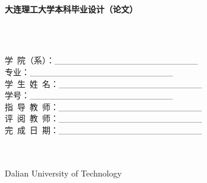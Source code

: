 \renewcommand{\figurename}{\zihao{5} \songti 图}	
\renewcommand{\tablename}{\zihao{5} \songti 表}
	\begin{titlepage}
		\begin{center}
			~\\[8pt]
			 {\songti\textbf{大连理工大学本科毕业设计（论文）}}
			~\\[35pt]
			\textbf{}
			~\\[15pt]
		\end{center}
		\textbf{}
		\begin{center}
			~\\[120pt]
			\begin{spacing}{1.7}
				 {\songti 学\ 院（系）：\_\_\_\_\_\_\_\_\_\_\_\_\_\_\_\_\_\_\_\_\_\_\_}\\
				 {\songti 专\qquad \quad  业：\_\_\_\_\_\_\_\_\_\_\_\_\_\_\_\_\_\_\_\_\_\_\_}\\
				 {\songti 学\ 生\ 姓\ 名：\_\_\_\_\_\_\_\_\_\_\_\_\_\_\_\_\_\_\_\_\_\_\_}\\
				 {\songti 学\qquad \quad 号：\_\_\_\_\_\_\_\_\_\_\_\_\_\_\_\_\_\_\_\_\_\_\_}\\
				 {\songti 指\ 导\ 教\ 师：\_\_\_\_\_\_\_\_\_\_\_\_\_\_\_\_\_\_\_\_\_\_\_}\\
				 {\songti 评\ 阅\ 教\ 师：\_\_\_\_\_\_\_\_\_\_\_\_\_\_\_\_\_\_\_\_\_\_\_}\\
				 {\songti 完\ 成\ 日\ 期：\_\_\_\_\_\_\_\_\_\_\_\_\_\_\_\_\_\_\_\_\_\_\_}\\
			\end{spacing}
			~\\[70pt]
			{ }\\
			{ Dalian University of Technology}
		\end{center}
	\newpage
	\end{titlepage}
	
